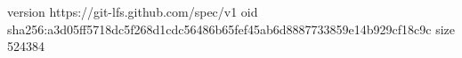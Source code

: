 version https://git-lfs.github.com/spec/v1
oid sha256:a3d05ff5718dc5f268d1cdc56486b65fef45ab6d8887733859e14b929cf18c9c
size 524384
